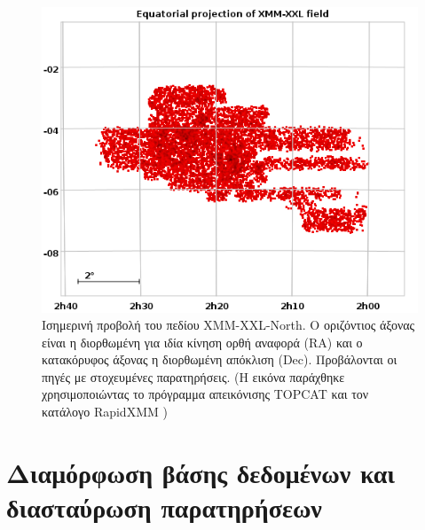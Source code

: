  \begin{figure}
 \begin{center}
 \includegraphics[scale= 0.6]{Figures/EquatorialViewXMMXXL.png}
 \caption{Ισημερινή προβολή του πεδίου \textlatin{XMM-XXL-North}. Ο οριζόντιος άξονας είναι η διορθωμένη για ιδία κίνηση ορθή αναφορά (\textlatin{RA}) και ο κατακόρυφος άξονας η διορθωμένη απόκλιση (\textlatin{Dec}). Προβάλονται οι πηγές με στοχευμένες παρατηρήσεις. (Η εικόνα παράχθηκε χρησιμοποιώντας το πρόγραμμα απεικόνισης \textlatin{TOPCAT} \cite{TopCat} και τον κατάλογο \textlatin{RapidXMM} \cite{RapidXMM}) }
 \label{fig:EquatorialView}
 \end{center}
 \end{figure}


\section{Διαμόρφωση βάσης δεδομένων και διασταύρωση παρατηρήσεων}



